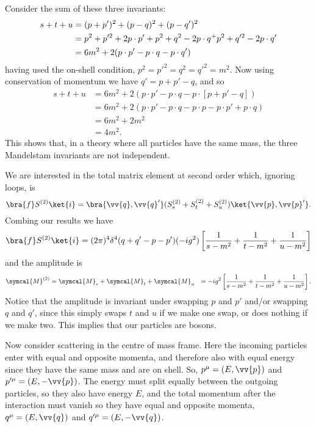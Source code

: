 \documentclass[fleqn]{NotesClass}
\newcommand{\amplitude}{\symcal{M}}
\begin{document}
    Consider the sum of these three invariants:
    \begin{align}
        s + t + u &= (p + p')^2 + (p - q)^2 + (p - q')^2\\
        &= p^2 + p'^2 + 2p\cdot p' + p^2 + q^2 - 2p\cdot q^ + p^2 + q'^2 - 2 p \cdot q'\notag \\
        &= 6m^2 + 2(p\cdot p' - p\cdot q - p\cdot q')
    \end{align}
    having used the on-shell condition, \(p^2 = p'^2 = q^2 = q'^2 = m^2\).
    Now using conservation of momentum we have \(q' = p + p' - q\), and so
    \begin{align}
        s + t + u &= 6m^2 + 2(p \cdot p' - p \cdot q - p \cdot [p + p' - q])\\
        &= 6m^2 + 2(p \cdot p' - p \cdot q - p \cdot p - p \cdot p' + p \cdot q)\\
        &= 6m^2 + 2m^2\\
        &= 4m^2.
    \end{align}
    This shows that, in a theory where all particles have the same mass, the three Mandelstam invariants are not independent.
    
    We are interested in the total matrix element at second order which, ignoring loops, is
    \begin{equation}
        \bra{f} S^{(2)} \ket{i} = \bra{\vv{q}, \vv{q}'} (S^{(2)}_s + S^{(2)}_t + S^{(2)}_u) \ket{\vv{p}, \vv{p}'}.
    \end{equation}
    Combing our results we have
    \begin{equation}
        \bra{f} S^{(2)} \ket{i} = (2\pi)^4 \delta^4(q + q' - p - p') (-ig^2) \left[ \frac{1}{s - m^2} + \frac{1}{t - m^2} + \frac{1}{u - m^2} \right]
    \end{equation}
    and the amplitude is
    \begin{align}
        \amplitude^{(2)} &= \amplitude_s + \amplitude_t + \amplitude_u
        &= -ig^2\left[ \frac{1}{s - m^2} + \frac{1}{t - m^2} + \frac{1}{u - m^2} \right].
    \end{align}
    Notice that the amplitude is invariant under swapping \(p\) and \(p'\) and/or swapping \(q\) and \(q'\), since this simply swaps \(t\) and \(u\) if we make one swap, or does nothing if we make two.
    This implies that our particles are bosons.
    
    Now consider scattering in the centre of mass frame.
    Here the incoming particles enter with equal and opposite momenta, and therefore also with equal energy since they have the same mass and are on shell.
    So, \(p^\mu = (E, \vv{p})\) and \(p'^\mu = (E, -\vv{p})\).
    The energy must split equally between the outgoing particles, so they also have energy \(E\), and the total momentum after the interaction must vanish so they have equal and opposite momenta, \(q^\mu = (E, \vv{q})\) and \(q'^\mu = (E, -\vv{q})\).
    
\end{document}
